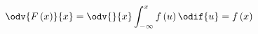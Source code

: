 \documentclass{article}
\begin{document}
\begin{multicols}{3}
    \begin{equation*}
        \odv{F\left( x \right)}{x} = \odv{}{x} \int_{-\infty}^x f\left( u \right) \odif{u} = f\left( x \right)
    \end{equation*}

\end{multicols}
\end{document}
